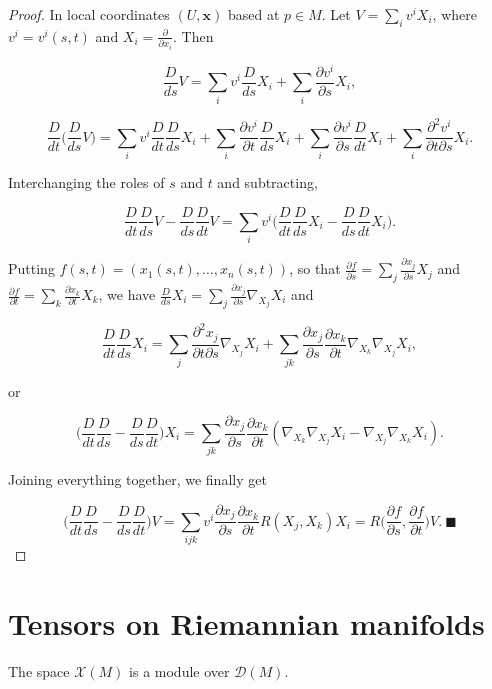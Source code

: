 \begin{proof}
  \sketch
  In local coordinates
  $(U,\mathbf{x})$ based at $p\in M$. Let $V=\sum_i v^i X_i$, where $v^i=v^i(s,t)$ and
  $X_i=\frac{\partial}{\partial x_i}$. Then
  
  $$
  \frac{D}{ds}V=\sum_i v^i\frac{D}{ds}X_i+\sum_i\frac{\partial v^i}{\partial s}X_i,
  $$
  
  $$
  \frac{D}{dt}\Big(\frac{D}{ds}V\Big)=\sum_i v^i\frac{D}{dt}\frac{D}{ds}X_i+\sum_i\frac{\partial v^i}{\partial t}\frac{D}{ds}X_i+\sum_i\frac{\partial v^i}{\partial s}\frac{D}{dt}X_i+\sum_i\frac{\partial^2 v^i}{\partial t\partial s}X_i.
  $$
  
  Interchanging the roles of $s$ and $t$ and subtracting,
  
  $$
  \frac{D}{dt}\frac{D}{ds}V-\frac{D}{ds}\frac{D}{dt}V=\sum_i v^i\Big(\frac{D}{dt}\frac{D}{ds}X_i-\frac{D}{ds}\frac{D}{dt}X_i\Big).
  $$
  
  Putting $f(s,t)=(x_1(s,t),\dots,x_n(s,t))$, so that
  $\frac{\partial f}{\partial s}=\sum_j\frac{\partial x_j}{\partial s}X_j$ and
  $\frac{\partial f}{\partial t}=\sum_k\frac{\partial x_k}{\partial t}X_k$, we have
  $\frac{D}{ds}X_i=\sum_j\frac{\partial x_j}{\partial s}\nabla_{X_j}X_i$ and
  
  $$
  \frac{D}{dt}\frac{D}{ds}X_i=\sum_j\frac{\partial^2 x_j}{\partial t\partial s}\nabla_{X_j}X_i+\sum_{jk}\frac{\partial x_j}{\partial s}\frac{\partial x_k}{\partial t}\nabla_{X_k}\nabla_{X_j}X_i,
  $$
  
  or
  
  $$
  \Big(\frac{D}{dt}\frac{D}{ds}-\frac{D}{ds}\frac{D}{dt}\Big)X_i=\sum_{jk}\frac{\partial x_j}{\partial s}\frac{\partial x_k}{\partial t}(\nabla_{X_k}\nabla_{X_j}X_i-\nabla_{X_j}\nabla_{X_k}X_i).
  $$
  
  Joining everything together, we finally get
  
  $$
  \Big(\frac{D}{dt}\frac{D}{ds}-\frac{D}{ds}\frac{D}{dt}\Big)V=\sum_{ijk}v^i\frac{\partial x_j}{\partial s}\frac{\partial x_k}{\partial t}R(X_j,X_k)X_i=R\Big(\frac{\partial f}{\partial s},\frac{\partial f}{\partial t}\Big)V.\ \blacksquare
  $$
\end{proof}

\section{Tensors on Riemannian manifolds}

The space $\mathcal{X}(M)$ is a module over $\mathcal{D}(M)$.

